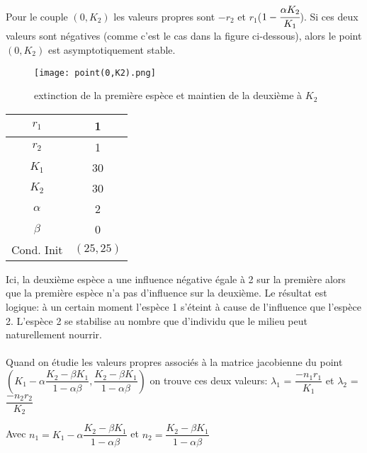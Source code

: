 \documentclass[11pt]{article}
\begin{document}
Pour le couple $(0,K_2)$ les valeurs propres sont $-r_2$ et $r_1$($1-\cfrac{\alpha K_2}{K_1}$). Si ces deux valeurs sont négatives (comme c'est le cas dans la figure ci-dessous), alors le point $(0,K_2)$ est asymptotiquement stable.
\begin{center}

\begin{figure}[H]
    \centering
    \texttt{[image: point(0,K2).png]}
    \caption{extinction de la première espèce et maintien de la deuxième à $K_2$}
    \label{1}
\end{figure}
\begin{tabular}{c|c}
     $r_1$&1  \\
     \hline
     $r_2$&1 \\
     \hline
     $K_1$&30 \\
     \hline
     $K_2$&30\\
     \hline
     $\alpha$&2\\
     \hline
     $\beta$&0\\
     \hline
     Cond. Init& $(25,25)$
\end{tabular}
\end{center}


Ici, la deuxième espèce a une influence négative égale à 2 sur la première alors que la première espèce n'a pas d'influence sur la deuxième. Le résultat est logique: à un certain moment l'espèce 1 s'éteint à cause de l'influence que l'espèce 2. L'espèce 2 se stabilise au nombre que d'individu que le milieu peut naturellement nourrir.\\\\

Quand on étudie les valeurs propres associés à la matrice jacobienne du point\\
$(K_1 - \alpha \dfrac{K_2-\beta K_1}{1 -\alpha \beta},\dfrac{K_2-\beta K_1}{1 -\alpha \beta})$  on trouve ces deux valeurs:
$\lambda_1$ = $\dfrac{-n_1r_1}{K_1}$ et $\lambda_2$ = $\dfrac{-n_2r_2}{K_2}$

Avec $n_1 = K_1 - \alpha \dfrac{K_2-\beta K_1}{1 -\alpha \beta}$ et $ n_2 = \dfrac{K_2-\beta K_1}{1 -\alpha \beta}$\\
\end{document}
